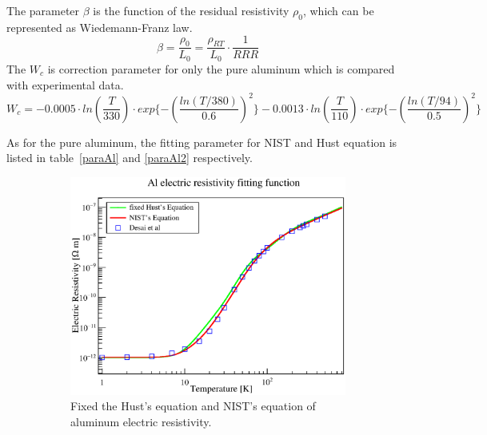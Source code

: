 The parameter $\beta$ is the function of the residual resistivity $\rho_0$, which can be represented as Wiedemann-Franz law.
\begin{equation}
 \beta = \frac{\rho_0}{L_0} = \frac{\rho_{RT}}{L_0} \cdot \frac{1}{RRR}
\end{equation}
The $W_c$ is correction parameter for only the pure aluminum which is compared with experimental data.
\begin{equation}
 W_c = -0.0005 \cdot ln(\frac{T}{330}) \cdot exp\{-(\frac{ln(T/380)}{0.6})^2\} -0.0013 \cdot ln(\frac{T}{110}) \cdot exp\{-(\frac{ln(T/94)}{0.5})^2\}
\end{equation}

As for the pure aluminum, the fitting parameter for NIST and Hust equation is listed in table~\ref{paraAl} and \ref{paraAl2} respectively.
  \begin{figure}[H]
   \begin{subfigure}{3.1in}
	\centering
    \includegraphics[scale=0.45]{chapter5/fig/alres1.eps}
	\caption{Fixed the Hust's equation and NIST's equation of aluminum electric resistivity.}
    \label{4alres}
   \end{subfigure}
   \quad
   \begin{subfigure}{3.1in}
    \centering

\end{subfigure}
\end{figure}

